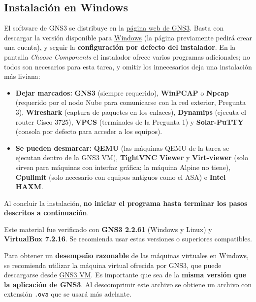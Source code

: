 \documentclass[letterpaper,12pt]{article}
\begin{document}
\subsection{Instalación en Windows}

El software de GNS3 se distribuye en la \href{https://www.gns3.com/}{página web de GNS3}. Basta con descargar la versión disponible para \href{https://www.gns3.com/software/download}{Windows} (la página previamente pedirá crear una cuenta), y seguir la \textbf{configuración por defecto del instalador}. En la pantalla \textit{Choose Components} el instalador ofrece varios programas adicionales; no todos son necesarios para esta tarea, y omitir los innecesarios deja una instalación más liviana:

\begin{itemize}
    \item \textbf{Dejar marcados:} \textbf{GNS3} (siempre requerido), \textbf{WinPCAP} o \textbf{Npcap} (requerido por el nodo Nube para comunicarse con la red exterior, Pregunta 3), \textbf{Wireshark} (captura de paquetes en los enlaces), \textbf{Dynamips} (ejecuta el router Cisco 3725), \textbf{VPCS} (terminales de la Pregunta 1) y \textbf{Solar-PuTTY} (consola por defecto para acceder a los equipos).
    \item \textbf{Se pueden desmarcar:} \textbf{QEMU} (las máquinas QEMU de la tarea se ejecutan dentro de la GNS3 VM), \textbf{TightVNC Viewer} y \textbf{Virt-viewer} (solo sirven para máquinas con interfaz gráfica; la máquina Alpine no tiene), \textbf{Cpulimit} (solo necesario con equipos antiguos como el ASA) e \textbf{Intel HAXM}.
\end{itemize}

Al concluir la instalación, \textbf{no iniciar el programa hasta terminar los pasos descritos a continuación}.

\begin{nota}
Este material fue verificado con \textbf{GNS3 2.2.61} (Windows y Linux) y \textbf{VirtualBox 7.2.16}. Se recomienda usar estas versiones o superiores compatibles.
\end{nota}

Para obtener un \textbf{desempeño razonable} de las máquinas virtuales en Windows, se recomienda utilizar la máquina virtual ofrecida por GNS3, que puede descargarse desde \href{https://gns3.com/software/download-vm}{GNS3 VM}. Es importante que sea de la \textbf{misma versión que la aplicación de GNS3}. Al descomprimir este archivo se obtiene un archivo con extensión \texttt{.ova} que se usará más adelante.
\end{document}
